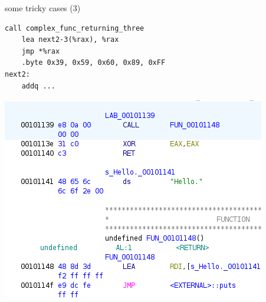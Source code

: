 \begin{frame}[fragile]{some tricky cases (3)}
\begin{Verbatim}[fontsize=\small]
    call complex_func_returning_three
    lea next2-3(%rax), %rax
    jmp *%rax
    .byte 0x39, 0x59, 0x60, 0x89, 0xFF
next2:
    addq ...
\end{Verbatim}
\end{frame}


\begin{frame}
\includegraphics[width=\textwidth]{../re-tools/ghidra-disass-mixed-detail}
\end{frame}
